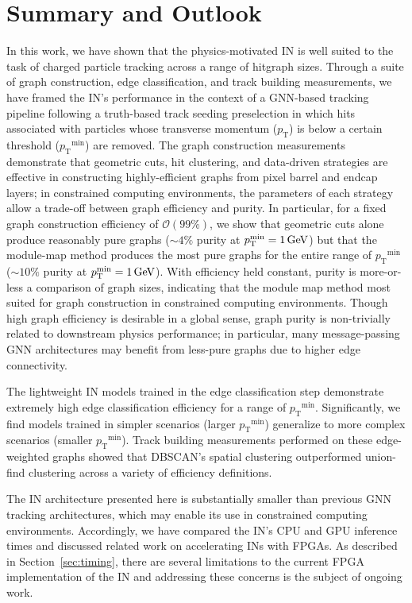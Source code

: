 \documentclass[twocolumn]{svjour3}
\newcommand{\pt}{\ensuremath{p_{\mathrm{T}}}\xspace}
\newcommand{\GeV}{\ensuremath{\,\text{Ge\hspace{-.08em}V}}\xspace}
\begin{document}
\section{Summary and Outlook}
\label{sec:summary}
In this work, we have shown that the physics-motivated IN is well suited to the task of charged particle tracking across a range of hitgraph sizes. 
Through a suite of graph construction, edge classification, and track building measurements, we have framed the IN's performance in the context of a GNN-based tracking pipeline following a truth-based track seeding preselection in which hits associated with particles whose transverse momentum ($\pt$) is below a certain threshold ($\pt^\mathrm{min}$) are removed. 
The graph construction measurements demonstrate that geometric cuts, hit clustering, and data-driven strategies are effective in constructing highly-efficient graphs from pixel barrel and endcap layers; in constrained computing environments, the parameters of each strategy allow a trade-off between graph efficiency and purity. 
In particular, for a fixed graph construction efficiency of $\mathcal{O}(99\%)$, we show that geometric cuts alone produce reasonably pure graphs ($\sim4\%$ purity at $\pt^\mathrm{min}=1\GeV$) but that the module-map method produces the most pure graphs for the entire range of $\pt^\mathrm{min}$ ($\sim10\%$ purity at $\pt^\mathrm{min}=1\GeV$).
With efficiency held constant, purity is more-or-less a comparison of graph sizes, indicating that the module map method most suited for graph construction in constrained computing environments. 
Though high graph efficiency is desirable in a global sense, graph purity is non-trivially related to downstream physics performance; in particular, many message-passing GNN architectures may benefit from less-pure graphs due to higher edge connectivity.

The lightweight IN models trained in the edge classification step demonstrate extremely high edge classification efficiency for a range of $\pt^\mathrm{min}$.
Significantly, we find models trained in simpler scenarios (larger $\pt^\mathrm{min}$) generalize to more complex scenarios (smaller $\pt^\mathrm{min}$).
Track building measurements performed on these edge-weighted graphs showed that DBSCAN's spatial clustering outperformed union-find clustering across a variety of efficiency definitions.

The IN architecture presented here is substantially smaller than previous GNN tracking architectures, which may enable its use in constrained computing environments.
Accordingly, we have compared the IN's CPU and GPU inference times and discussed related work on accelerating INs with FPGAs. 
As described in Section~\ref{sec:timing}, there are several limitations to the current FPGA implementation of the IN and addressing these concerns is the subject of ongoing work. 
  
\end{document}
